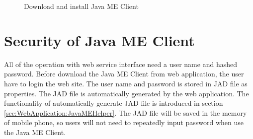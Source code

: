 \begin{figure}[!hbtp]
\centering
{}
\caption{Download and install Java ME Client}
\label{fig:DownloadAndInstallJavaMEClient}
\end{figure}


\section{Security of Java ME Client}
\label{sec:JavaMEClient:SecurityOfJavaMEClient}

All of the operation with web service interface need a user name and hashed password. Before download the Java ME Client from web application, the user have to login the web site. The user name and password is stored in JAD file as properties. The JAD file is automatically generated by the web application. The functionality of automatically generate JAD file is introduced in section \ref{sec:WebApplication:JavaMEHelper}. The JAD file will be saved in the memory of mobile phone, so users will not need to repeatedly input password when use the Java ME Client. 

